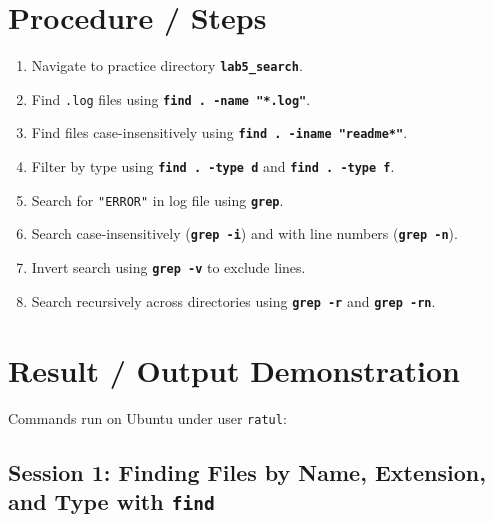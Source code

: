 \documentclass[10pt,a4paper]{article}
\newcommand{\cmd}[1]{\texttt{\textbf{#1}}}
\begin{document}
\section{Procedure / Steps}
\begin{enumerate}[noitemsep,topsep=1pt,leftmargin=1.4em]
  \item Navigate to practice directory \cmd{lab5\_search}.
  \item Find \texttt{.log} files using \cmd{find . -name "*.log"}.
  \item Find files case-insensitively using \cmd{find . -iname "readme*"}.
  \item Filter by type using \cmd{find . -type d} and \cmd{find . -type f}.
  \item Search for \texttt{"ERROR"} in log file using \cmd{grep}.
  \item Search case-insensitively (\cmd{grep -i}) and with line numbers (\cmd{grep -n}).
  \item Invert search using \cmd{grep -v} to exclude lines.
  \item Search recursively across directories using \cmd{grep -r} and \cmd{grep -rn}.
\end{enumerate}

\newpage

\section{Result / Output Demonstration}
Commands run on Ubuntu under user \texttt{ratul}:

\subsection{Session 1: Finding Files by Name, Extension, and Type with \cmd{find}}
\end{document}
